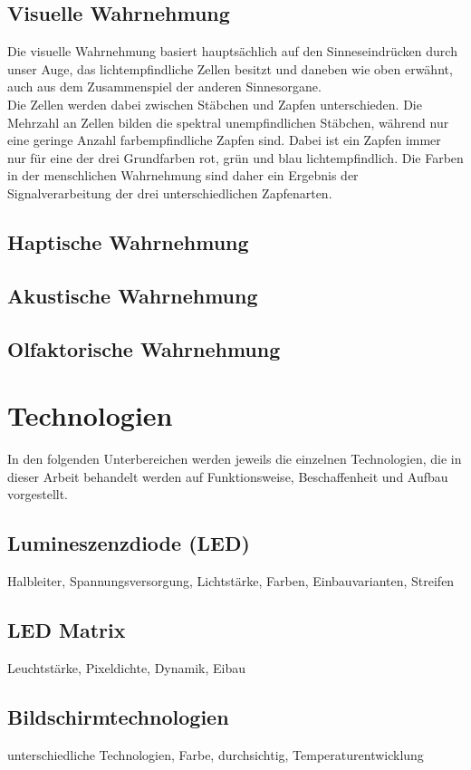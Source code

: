 \subsection{Visuelle Wahrnehmung}
Die visuelle Wahrnehmung basiert hauptsächlich auf den Sinneseindrücken durch unser Auge, das lichtempfindliche Zellen besitzt und daneben wie oben erwähnt, auch aus dem Zusammenspiel der anderen Sinnesorgane.\\
Die Zellen werden dabei zwischen Stäbchen und Zapfen unterschieden. Die Mehrzahl an Zellen bilden die spektral unempfindlichen Stäbchen, während nur eine geringe Anzahl farbempfindliche Zapfen sind. Dabei ist ein Zapfen immer nur für eine der drei Grundfarben rot, grün und blau lichtempfindlich. Die Farben in der menschlichen Wahrnehmung sind daher ein Ergebnis der Signalverarbeitung der drei unterschiedlichen Zapfenarten. \cite[Vgl. Seite 14]{Buhler.2017}

\subsection{Haptische Wahrnehmung}
\subsection{Akustische Wahrnehmung}
\subsection{Olfaktorische Wahrnehmung}

\section{Technologien}
In den folgenden Unterbereichen werden jeweils die einzelnen Technologien, die in dieser Arbeit behandelt werden auf Funktionsweise, Beschaffenheit und Aufbau vorgestellt.
\subsection{Lumineszenzdiode (LED)}
Halbleiter, Spannungsversorgung, Lichtstärke, Farben, Einbauvarianten, Streifen
\cite{G}
\subsection{LED Matrix}
Leuchtstärke, Pixeldichte, Dynamik, Eibau
\subsection{Bildschirmtechnologien}
unterschiedliche Technologien, Farbe, durchsichtig, Temperaturentwicklung
